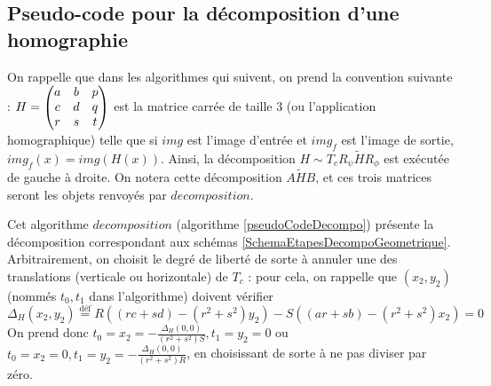 \subsection{Pseudo-code pour la décomposition d'une homographie}
 
 On rappelle que dans les algorithmes qui suivent, on prend la convention suivante : $H = \begin{pmatrix} a&b&p\\c&d&q\\r&s&t \end{pmatrix}$ est la matrice carrée de taille 3 (ou l'application homographique) telle que si $img$ est l'image d'entrée et $img_f$ est l'image de sortie, $img_f(x) = img(H(x))$. Ainsi, la décomposition $H \sim T_{c} R_{\psi}  \tilde H R_{\phi}$ est exécutée de gauche à droite. On notera cette décomposition $A \tilde H B$, et ces trois matrices seront les objets renvoyés par $decomposition$.
 
 Cet algorithme $decomposition$ (algorithme \ref{pseudoCodeDecompo}) présente la décomposition correspondant aux schémas \ref{SchemaEtapesDecompoGeometrique}. Arbitrairement, on choisit le degré de liberté de sorte à annuler une des translations (verticale ou horizontale) de $T_c$ : pour cela, on rappelle que $(x_2,y_2)$ (nommés $t_0,t_1$ dans l'algorithme) doivent vérifier
 \[\Delta_H(x_2 , y_2 ) \stackrel{\text{déf}}{=} R ((rc+sd)-(r^2 + s^2)y_2) - S ((ar+sb)-(r^2 + s^2 )x_2) = 0 \]
 On prend donc $t_0 = x_2 = -\frac{\Delta_H(0,0)}{(r^2+s^2)S}, t_1 = y_2 = 0$ ou $t_0 = x_2 = 0, t_1 = y_2 = -\frac{\Delta_H(0,0)}{(r^2+s^2)R}$, en choisissant de sorte à ne pas diviser par zéro.
 
